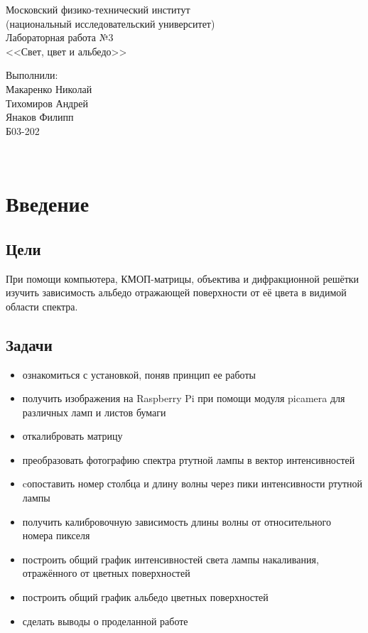 \documentclass[a4paper,12pt]{article} %
\begin{document}
	\begin{titlepage}
		\begin{center}
			\large Московский физико-технический институт\\
			(национальный исследовательский университет)\\
			\vspace{9cm}
			\large{Лабораторная работа №3}\\ \Huge{<<Свет, цвет и альбедо>>}
		\end{center}
		
		\vspace{10cm}
		{\par \raggedleft \large Выполнили:\\ Макаренко Николай\\ Тихомиров Андрей\\ Янаков Филипп\\ Б03-202\\}
	\end{titlepage}\
 
\section{Введение}
 
    \subsection{Цели}
При помощи компьютера, КМОП-матрицы, объектива и дифракционной решётки изучить зависимость альбедо отражающей поверхности от её цвета в видимой области спектра.
    \subsection{Задачи}
    \begin{itemize}
        \item ознакомиться с установкой, поняв принцип ее работы
        \item получить изображения на Raspberry Pi при помощи модуля picamera для различных ламп и листов бумаги
        \item откалибровать матрицу
        \item преобразовать фотографию спектра ртутной лампы в вектор интенсивностей
        \item cопоставить номер столбца и длину волны через пики интенсивности ртутной лампы
        \item получить калибровочную зависимость длины волны от относительного номера пикселя
        \item построить общий график интенсивностей света лампы накаливания, отражённого от цветных поверхностей
        \item построить общий график альбедо цветных поверхностей
        \item сделать выводы о проделанной работе
    \end{itemize}
\end{document}
